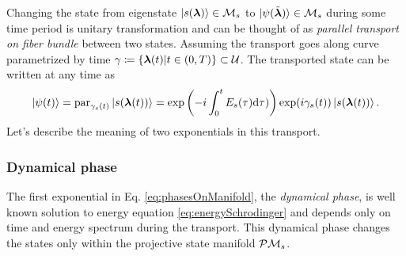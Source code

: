 Changing the state from eigenstate $\ket{s({\bm\lambda})}\in\mathcal{M}_s$ to $\ket{\psi(\tilde{{\bm\lambda}})}\in\mathcal{M}_s$ during some time period is unitary transformation and can be thought of as \emph{parallel transport on fiber bundle} between two states. Assuming the transport goes along curve parametrized by time $\gamma\coloneqq\{{\bm\lambda}(t)|t\in(0,T)\}\subset \mathcal U$. The transported state can be written at any time as
\begin{equation}
    \ket{\psi(t)} = \textrm{par}_{\gamma_s(t)}\ket{s({\bm\lambda}(t))} = \exp\left(-i\int_0^tE_s(\tau)\mathrm{d}\tau)\right)\exp(i\gamma_s(t))\ket{s({\bm\lambda}(t))}.
    \label{eq:phasesOnManifold}
\end{equation}
Let's describe the meaning of two exponentials in this transport.
\subsubsection{Dynamical phase}
The first exponential in Eq. \ref{eq:phasesOnManifold}, the \emph{dynamical phase}, is well known solution to energy \Schrodinger equation \ref{eq:energySchrodinger} and depends only on time and energy spectrum during the transport. This dynamical phase changes the states only within the projective state manifold $\mathcal{P}\mathcal{M}_s$. 

